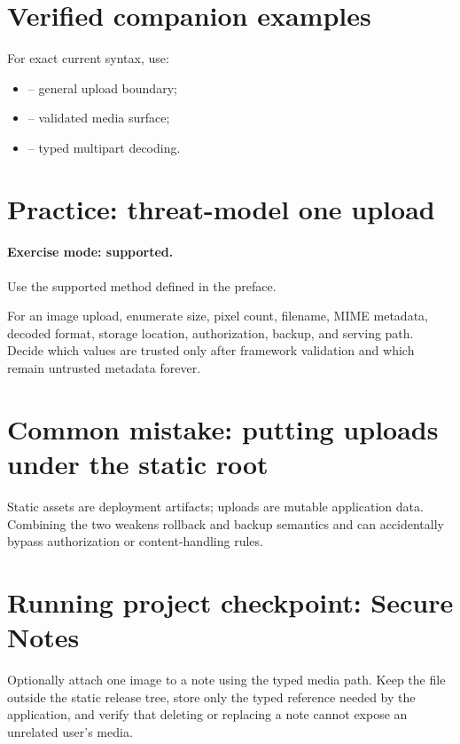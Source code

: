 \section{Verified companion examples}
For exact current syntax, use:
\begin{itemize}
  \item {} -- general upload boundary;
  \item {} -- validated media surface;
  \item {} -- typed multipart decoding.
\end{itemize}

\section{Practice: threat-model one upload}
\paragraph{Exercise mode: supported.} Use the supported method defined in the preface.

For an image upload, enumerate size, pixel count, filename, MIME metadata, decoded format, storage location, authorization, backup, and serving path. Decide which values are trusted only after framework validation and which remain untrusted metadata forever.

\section{Common mistake: putting uploads under the static root}
Static assets are deployment artifacts; uploads are mutable application data. Combining the two weakens rollback and backup semantics and can accidentally bypass authorization or content-handling rules.

\section{Running project checkpoint: Secure Notes}
Optionally attach one image to a note using the typed media path. Keep the file outside the static release tree, store only the typed reference needed by the application, and verify that deleting or replacing a note cannot expose an unrelated user's media.
